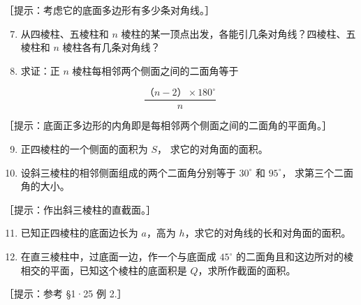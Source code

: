 ［提示：考虑它的底面多边形有多少条对角线。］

\begin{enumerate}
\setcounter{enumi}{6}
\item
  从四棱柱、五棱柱和 \(n\)
  棱柱的某一顶点出发，各能引几条对角线？四棱柱、五棱柱和 \(n\)
  棱柱各有几条对角线？
\item
  求证：正 \(n\) 棱柱每相邻两个侧面之间的二面角等于
\end{enumerate}

\[
\frac {\text{（}n - 2\text{）} \times 180^{\circ}}{n}
\]

［提示：底面正多边形的内角即是每相邻两个侧面之间的二面角的平面角。］

\begin{enumerate}
\setcounter{enumi}{8}
\item
  正四棱柱的一个侧面的面积为 \(S\)， 求它的对角面的面积。
\item
  设斜三棱柱的相邻侧面组成的两个二面角分别等于 \(30^{\circ}\) 和
  \(95^{\circ}\)， 求第三个二面角的大小。
\end{enumerate}

［提示：作出斜三棱柱的直截面。］

\begin{enumerate}
\setcounter{enumi}{10}
\item
  已知正四棱柱的底面边长为 \(a\)，高为
  \(h\)，求它的对角线的长和对角面的面积。
\item
  在直三棱柱中，过底面一边，作一个与底面成 \(45^{\circ}\)
  的二面角且和这边所对的棱相交的平面，已知这个棱柱的底面积是
  \(Q\)，求所作截面的面积。
\end{enumerate}

［提示：参考 §1·25 例 2.］

